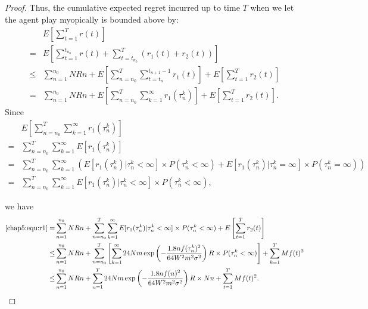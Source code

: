 \begin{proof}
                    Thus, the cumulative expected regret incurred up to time $T$ when we let the agent play myopically is bounded above by:
                    \begin{align}
                    &E\left[\sum_{t=1}^{T}r(t)\right] \nonumber \\
                      =&E\left[\sum_{t=1}^{t_{n_{0}}} r(t) + \sum_{t=t_{n_{0}}}^{T}(r_1(t)+r_2(t))\right]  \nonumber \\
                      \leq & \sum_{n=1}^{n_{0}}NRn + E\left[\sum_{n=n_{0}}^{T}\sum_{t=t_{n}}^{t_{n+1}-1}r_1(t)\right]+ E\left[\sum_{t=1}^{T}r_2(t)\right] \nonumber \\
                      =& \sum_{n=1}^{n_{0}}NRn + E\left[\sum_{n=n_{0}}^{T}\sum_{k=1}^{\infty}r_1(\tau_{n}^{k})\right]+ E\left[\sum_{t=1}^{T}r_2(t)\right]. \label{chap5:equ:r1}
                      \end{align}
                      Since
                      \begin{align}
                      & E\left[\sum_{n=n_{0}}^{T}\sum_{k=1}^{\infty}r_1(\tau_{n}^{k})\right] \nonumber\\
                        = &  \sum_{n=n_{0}}^{T}\sum_{k=1}^{\infty}E[r_1(\tau_{n}^{k})] \nonumber \\
                        = &  \sum_{n=n_{0}}^{T}\sum_{k=1}^{\infty}(E[r_1(\tau_{n}^{k})|\tau_{n}^{k}<\infty]\times P(\tau_{n}^{k}<\infty)+E[r_1(\tau_{n}^{k})|\tau_{n}^{k}=\infty]\times P(\tau_{n}^{k}=\infty)) \nonumber \\
                        = & \sum_{n=n_{0}}^{T}\sum_{k=1}^{\infty}E[r_1(\tau_{n}^{k})|\tau_{n}^{k}<\infty]\times P(\tau_{n}^{k}<\infty), \nonumber
                        \end{align}

                        we have
                        \begin{align}
                        \eqref{chap5:equ:r1}= & \sum_{n=1}^{n_{0}}NRn + \sum_{n=n_{0}}^{T}\sum_{k=1}^{\infty}E[r_1(\tau_{n}^{k})|\tau_{n}^{k}<\infty]\times P(\tau_{n}^{k}<\infty) + E\left[\sum_{t=1}^{T}r_2(t)\right] \nonumber \\
                          \leq & \sum_{n=1}^{n_{0}}NRn + \sum_{n=n_{0}}^{T}\left[\sum_{k=1}^{\infty}24Nm\exp\left(-\frac{1.8n f(\tau_{n}^{k})^2}{64 W^2 m^2\sigma^2}\right) R\times P(\tau_{n}^{k}<\infty) \right]+ \sum_{k=1}^{T}Mf(t)^2 \nonumber \\
                          \leq & \sum_{n=1}^{n_{0}}NRn + \sum_{n=1}^{T} 24Nm\exp\left(-\frac{1.8n f(n)^2}{64 W^2 m^2\sigma^2}\right) R \times Nn+ \sum_{t=1}^{T}Mf(t)^2. \label{chap5:equ:regret}
                          \end{align}



\end{proof}
